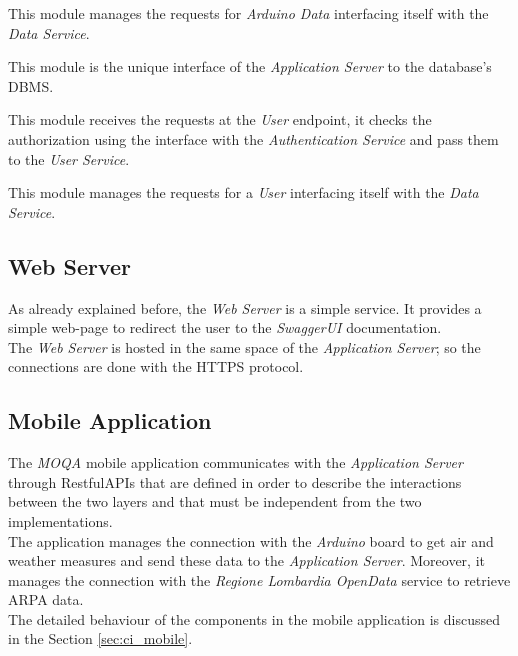 This module manages the requests for \textit{Arduino Data} interfacing itself with the \textit{Data Service}.

This module is the unique interface of the \textit{Application Server} to the database's DBMS.

This module receives the requests at the \textit{User} endpoint, it checks the authorization using the interface with the \textit{Authentication Service} and pass them to the \textit{User Service}.

This module manages the requests for a \textit{User} interfacing itself with the \textit{Data Service}.

\clearpage
\subsection{Web Server}
As already explained before, the \textit{Web Server} is a simple service. It provides a simple web-page to redirect the user to the \textit{SwaggerUI} documentation.\\
The \textit{Web Server} is hosted in the same space of the \textit{Application Server}; so the connections are done with the HTTPS protocol.\\

\subsection{Mobile Application}
The \textit{MOQA} mobile application communicates with the \textit{Application Server} through RestfulAPIs that are defined in order to describe the interactions between the two layers and that must be independent from the two implementations.\\
The application manages the connection with the \textit{Arduino} board to get air and weather measures and send these data to the \textit{Application Server}. Moreover, it manages the connection with the \textit{Regione Lombardia OpenData} service to retrieve ARPA data.\\

The detailed behaviour of the components in the mobile application is discussed in the Section \ref{sec:ci_mobile}.

